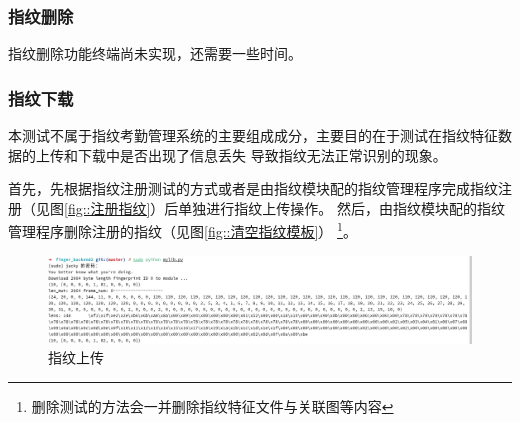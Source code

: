     \subsubsection{指纹删除}

    指纹删除功能终端尚未实现，还需要一些时间。

    \subsubsection{指纹下载}

    本测试不属于指纹考勤管理系统的主要组成成分，主要目的在于测试在指纹特征数据的上传和下载中是否出现了信息丢失
    导致指纹无法正常识别的现象。

    首先，先根据指纹注册测试的方式或者是由指纹模块配的指纹管理程序完成指纹注册（见图\ref{fig::注册指纹}）后单独进行指纹上传操作。
    然后，由指纹模块配的指纹管理程序删除注册的指纹（见图\ref{fig::清空指纹模板}）
    \footnote{删除测试的方法会一并删除指纹特征文件与关联图等内容}。

    \begin{figure}[ht]
        \centering
        \caption{指纹上传}    \label{test::指纹上传}
        \includegraphics[width=\textwidth]{./imgs/测试-指纹上传.png}
    \end{figure}   

